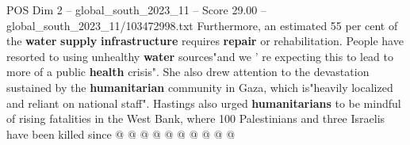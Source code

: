 \begin{textsample}{POS Dim 2 – global\_south\_2023\_11 – Score 29.00 – global\_south\_2023\_11/103472998.txt}
Furthermore, an estimated 55 per cent of the \textbf{water} \textbf{supply} \textbf{infrastructure} requires \textbf{repair} or rehabilitation.
People have resorted to using unhealthy \textbf{water} sources"and we ' re expecting this to lead to more of a public \textbf{health} crisis".
She also drew attention to the devastation sustained by the \textbf{humanitarian} community in Gaza, which is"heavily localized and reliant on national staff".
Hastings also urged \textbf{humanitarians} to be mindful of rising fatalities in the West Bank, where 100 Palestinians and three Israelis have been killed since @ @ @ @ @ @ @ @ @ @

\end{textsample}
